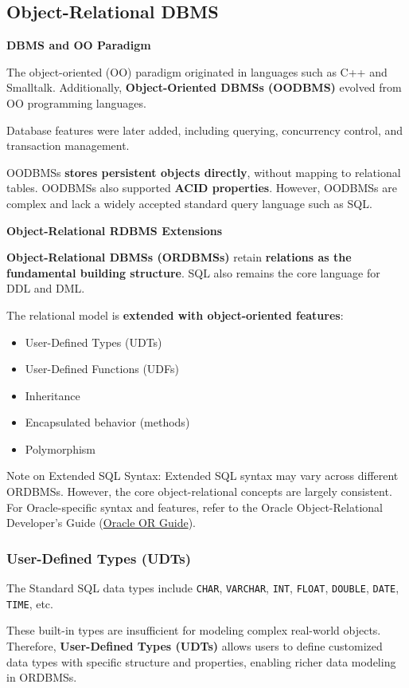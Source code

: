\documentclass[11pt]{article}
\newenvironment{aside}
  {\begin{mdframed}[style=0,%
      leftline=false,rightline=false,leftmargin=2em,rightmargin=2em,%
          innerleftmargin=0pt,innerrightmargin=0pt,linewidth=0.75pt,%
      skipabove=7pt,skipbelow=7pt]\small}
  {\end{mdframed}}
\newcommand{\subsec}[1]{
    \vspace{11pt}
    \subsection{#1}
    \vspace{11pt}
}
\newcommand{\sssec}[1]{
    \vspace{11pt}
    \subsubsection{#1}
    \vspace{11pt}
}
\newcommand{\boldsec}[1]{
    \vspace{11pt}
    \textbf{#1}
    \vspace{11pt}
}
\newcommand{\boldsecbottom}[1]{
    \textbf{#1}
    \vspace{11pt}
}
\begin{document}
\subsec{Object-Relational DBMS}

\boldsecbottom{DBMS and OO Paradigm}

The object-oriented (OO) paradigm originated in languages such as C++ and Smalltalk. Additionally, \textbf{Object-Oriented DBMSs (OODBMS)} evolved from OO programming languages.

Database features were later added, including querying, concurrency control, and transaction management.

OODBMSs \textbf{stores persistent objects directly}, without mapping to relational tables. OODBMSs also supported \textbf{ACID properties}. However, OODBMSs are complex and lack a widely accepted standard query language such as SQL.

\boldsec{Object-Relational RDBMS Extensions}

\textbf{Object-Relational DBMSs (ORDBMSs)} retain \textbf{relations as the fundamental building structure}. SQL also remains the core language for DDL and DML.

The relational model is \textbf{extended with object-oriented features}:
\begin{itemize}
    \item User-Defined Types (UDTs)
    \item User-Defined Functions (UDFs)
    \item Inheritance
    \item Encapsulated behavior (methods)
    \item Polymorphism
\end{itemize}
\vspace{11pt}

\begin{aside}
    Note on Extended SQL Syntax: Extended SQL syntax may vary across different ORDBMSs. However, the core object-relational concepts are largely consistent. For Oracle-specific syntax and features, refer to the Oracle Object-Relational Developer's Guide (\href{https://docs.oracle.com/en/database/oracle/oracle-database/26/adobj/index.html}{Oracle OR Guide}).
\end{aside}

\sssec{User-Defined Types (UDTs)}

The Standard SQL data types include \texttt{CHAR}, \texttt{VARCHAR}, \texttt{INT}, \texttt{FLOAT}, \texttt{DOUBLE}, \texttt{DATE}, \texttt{TIME}, etc.

These built-in types are insufficient for modeling complex real-world objects. Therefore, \textbf{User-Defined Types (UDTs)} allows users to define customized data types with specific structure and properties, enabling richer data modeling in ORDBMSs.
\end{document}
